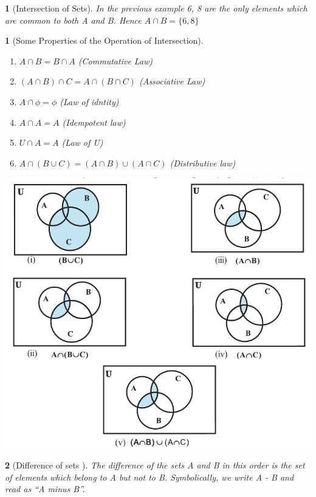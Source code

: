 \documentclass[12pt]{article}
\theoremstyle{colored}
\newtheorem*{defn}{}
\theoremstyle{subcolored}
\newtheorem*{subdefn}{}
\begin{document}
\begin{multicols}{2}
\begin{defn}[\large Intersection of Sets]
In the previous example  6, 8 are the only elements which are common to both A and B.
Hence $A \cap B = \{ 6, 8 \}$
\end{defn}

\begin{subdefn}[Some Properties of the Operation of Intersection]
    \hfill \break
    \begin{enumerate}
        \item[(i)] $A \cap B = B \cap A$  (Commutative Law)
        \item[(ii)] $(A \cap B)\cap C = A \cap (B \cap C)$ (Associative Law) 
        \item[(iii)] $A \cap \phi =\phi$ (Law of idntity)
        \item[(iv)] $A \cap A =A$ (Idempotent law) 
        \item[(v)] $U \cap A = A$ (Law of U)
        \item[(vi)] $A \cap (B \cup C)= (A \cap B) \cup (A \cap C)$ (Distributive law)
    \end{enumerate}

    \begin{center}
        \includegraphics[scale=0.35]{set5.png}
    \end{center}

\end{subdefn}

\begin{defn}[\large Difference of sets ]
    \hfill \break
    The difference of the sets A and B in this order is the set
of elements which belong to A but not to B. Symbolically, we write A - B and read as
“A minus B”.


\end{defn}
\end{multicols}
\end{document}
